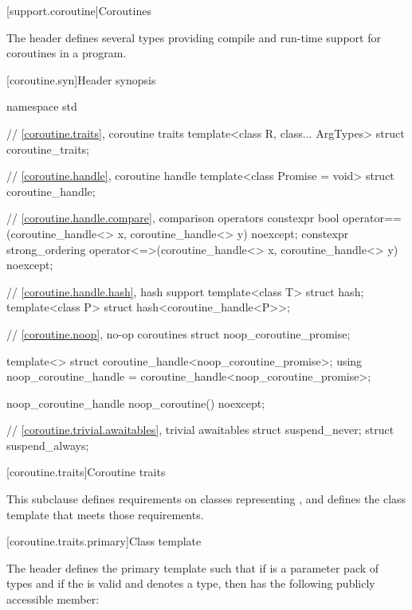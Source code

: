 [support.coroutine]{Coroutines}

\pnum
The header
defines several types providing
compile and run-time support for
coroutines in a \Cpp{} program.

[coroutine.syn]{Header  synopsis}

%
%
%
\begin{codeblock}
namespace std {
  // \ref{coroutine.traits}, coroutine traits
  template<class R, class... ArgTypes>
    struct coroutine_traits;

  // \ref{coroutine.handle}, coroutine handle
  template<class Promise = void>
    struct coroutine_handle;

  // \ref{coroutine.handle.compare}, comparison operators
  constexpr bool operator==(coroutine_handle<> x, coroutine_handle<> y) noexcept;
  constexpr strong_ordering operator<=>(coroutine_handle<> x, coroutine_handle<> y) noexcept;

  // \ref{coroutine.handle.hash}, hash support
  template<class T> struct hash;
  template<class P> struct hash<coroutine_handle<P>>;

  // \ref{coroutine.noop}, no-op coroutines
  struct noop_coroutine_promise;

  template<> struct coroutine_handle<noop_coroutine_promise>;
  using noop_coroutine_handle = coroutine_handle<noop_coroutine_promise>;

  noop_coroutine_handle noop_coroutine() noexcept;

  // \ref{coroutine.trivial.awaitables}, trivial awaitables
  struct suspend_never;
  struct suspend_always;
}
\end{codeblock}

[coroutine.traits]{Coroutine traits}

\pnum
This subclause defines requirements on classes representing
,
and defines the class template
that meets those requirements.

[coroutine.traits.primary]{Class template }

\pnum
The header  defines the primary template
 such that
if  is a parameter pack of types and
if the   is valid and
denotes a type,
then  has the following publicly
accessible member:

